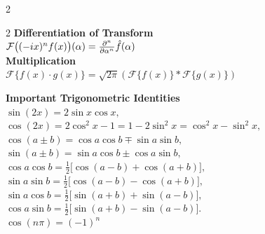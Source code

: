 \documentclass[8pt]{article}
\begin{document}
\begin{multicols}{2}
\begin{minipage}[htp]{0.55\textwidth}
\begin{multicols}{2}
			\textbf{Differentiation of Transform} \\[2pt]
			$
				\mathcal{F}\big((-ix)^n f(x)\big)(\alpha) = \frac{\partial^n}{\partial \alpha^n} \hat{f}(\alpha) \\[4pt]
			$\\
			\textbf{Multiplication} \\
			$
				\mathcal{F}\{f(x) \cdot g(x)\} = \sqrt{2\pi}\left( \mathcal{F}\{f(x)\} * \mathcal{F}\{g(x)\} \right)
			$ \\[4pt]
		\end{multicols}
	\end{minipage}
	\normalsize
	\noindent \textbf{Important Trigonometric Identities} \\[2pt]
	$\sin(2x) = 2\sin x\cos x,$ \\[3pt]
	$\cos(2x) = 2\cos^2 x - 1 = 1 - 2\sin^2 x = \cos^2 x - \sin^2 x,$ \\[3pt]
	$\cos(a \pm b) = \cos a\cos b \mp \sin a\sin b,$ \\[3pt]
	$\sin(a \pm b) = \sin a\cos b \pm \cos a\sin b,$ \\[3pt]
	$\cos a\cos b = \tfrac{1}{2}\bigl[\cos(a - b) + \cos(a + b)\bigr],$ \\[3pt]
	$\sin a\sin b = \tfrac{1}{2}\bigl[\cos(a - b) - \cos(a + b)\bigr],$ \\[3pt]
	$\sin a\cos b = \tfrac{1}{2}\bigl[\sin(a + b) + \sin(a - b)\bigr],$ \\[3pt]
	$\cos a\sin b = \tfrac{1}{2}\bigl[\sin(a + b) - \sin(a - b)\bigr].$\\[3pt]
	$\cos(n \pi) = (-1)^n$
	\normalsize
\end{multicols}
\endgroup
\end{document}
